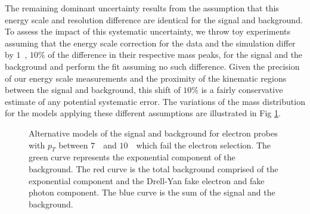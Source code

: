 \documentclass{cmspaper}
\begin{document}
The remaining dominant uncertainty results from the assumption that this energy scale and resolution
difference are identical for the signal and background. To assess the impact of this systematic uncertainty, 
we throw toy experiments assuming that the energy scale correction for the data and the simulation
differ by $1$~\GeV, $10\%$ of the difference in their respective mass peaks, 
for the signal and the background and perform the fit assuming no such difference. Given the precision
of our energy scale measurements and the proximity of the kinematic regions between the signal and background,
this shift of $10\%$ is a fairly conservative estimate of any potential systematic error. 
The variations of the mass distribution for the models applying these different assumptions are illustrated in 
Fig \ref{fig:SystematicsModels}.



\begin{figure}[htb]
  \begin{center}
    \caption{Alternative models of the signal and background for electron probes 
      with $p_{T}$ between $7$~\GeV\ and $10$~\GeV\ which fail the electron selection.
      The green curve represents the exponential component of the background. The red curve is the total background
      comprised of the exponential component and the Drell-Yan fake electron and fake photon component.
      The blue curve is the sum of the signal and the background.
    }
    \label{fig:SystematicsModels}
  \end{center}
\end{figure}
\end{document}
